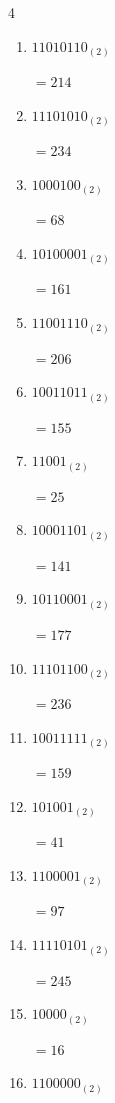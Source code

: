 \begin{multicols}{4}
\begin{enumerate}
        $=162$

  \item $11010110_{(2)}$

        $=214$

  \item $11101010_{(2)}$

        $=234$

  \item $1000100_{(2)}$

        $=68$

  \item $10100001_{(2)}$

        $=161$

  \item $11001110_{(2)}$

        $=206$

  \item $10011011_{(2)}$

        $=155$

  \item $11001_{(2)}$

        $=25$

  \item $10001101_{(2)}$

        $=141$

  \item $10110001_{(2)}$

        $=177$

  \item $11101100_{(2)}$

        $=236$

  \item $10011111_{(2)}$

        $=159$

  \item $101001_{(2)}$

        $=41$

  \item $1100001_{(2)}$

        $=97$

\columnbreak %

\resetques

  \item $11110101_{(2)}$

        $=245$

  \item $10000_{(2)}$

        $=16$

  \item $1100000_{(2)}$


\end{enumerate}
\end{multicols}
